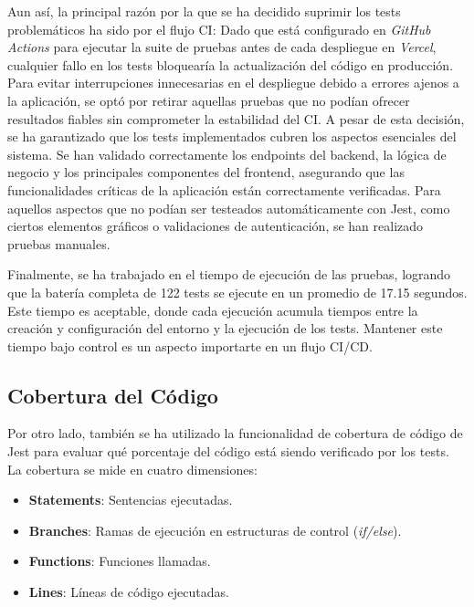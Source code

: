 Aun así, la principal razón por la que se ha decidido suprimir los tests problemáticos ha sido por el flujo CI: Dado que está configurado en \textit{GitHub Actions} para ejecutar la suite de pruebas antes de cada despliegue en \textit{Vercel}, cualquier fallo en los tests bloquearía la actualización del código en producción. Para evitar interrupciones innecesarias en el despliegue debido a errores ajenos a la aplicación, se optó por retirar aquellas pruebas que no podían ofrecer resultados fiables sin comprometer la estabilidad del CI. A pesar de esta decisión, se ha garantizado que los tests implementados cubren los aspectos esenciales del sistema. Se han validado correctamente los endpoints del backend, la lógica de negocio y los principales componentes del frontend, asegurando que las funcionalidades críticas de la aplicación están correctamente verificadas. Para aquellos aspectos que no podían ser testeados automáticamente con Jest, como ciertos elementos gráficos o validaciones de autenticación, se han realizado pruebas manuales.

Finalmente, se ha trabajado en el tiempo de ejecución de las pruebas, logrando que la batería completa de 122 tests se ejecute en un promedio de 17.15 segundos. Este tiempo es aceptable, donde cada ejecución acumula tiempos entre la creación y configuración del entorno y la ejecución de los tests. Mantener este tiempo bajo control es un aspecto importarte en un flujo CI/CD.

\subsection{Cobertura del Código}

Por otro lado, también se ha utilizado la funcionalidad de cobertura de código de Jest para evaluar qué porcentaje del código está siendo verificado por los tests. La cobertura se mide en cuatro dimensiones:

\begin{itemize}
    \item \textbf{Statements}: Sentencias ejecutadas. \vspace{-5pt}
    \item \textbf{Branches}: Ramas de ejecución en estructuras de control (\textit{if/else}). \vspace{-5pt}
    \item \textbf{Functions}: Funciones llamadas. \vspace{-5pt}
    \item \textbf{Lines}: Líneas de código ejecutadas.
\end{itemize}

